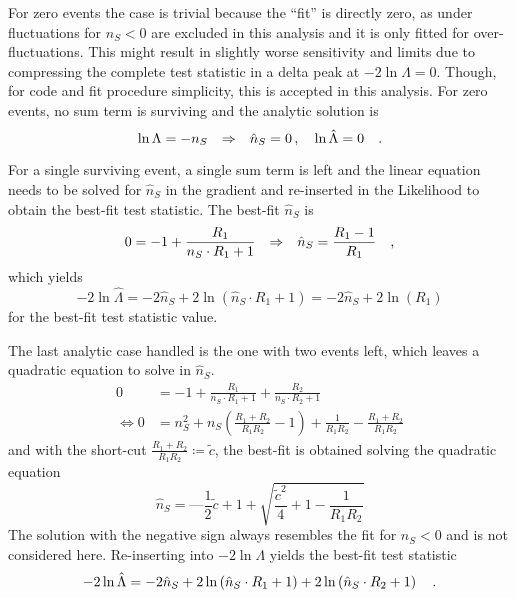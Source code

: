 For zero events the case is trivial because the \enquote{fit} is directly zero, as under fluctuations for $n_S < 0$ are excluded in this analysis and it is only fitted for over-fluctuations.
This might result in slightly worse sensitivity and limits due to compressing the complete test statistic in a delta peak at $-2\ln\Lambda=0$.
Though, for code and fit procedure simplicity, this is accepted in this analysis. \cite{Aartsen:2016lir}
For zero events, no sum term is surviving and the analytic solution is
\begin{equation}
  \ln\Lambda = -n_S
  \quad\text{$\Rightarrow$}\quad
  \hat{n}_S = 0 \, ,\quad \ln\hat{\Lambda} = 0
  \quad\text{.}
\end{equation}

For a single surviving event, a single sum term is left and the linear equation needs to be solved for $\hat{n}_S$ in the gradient and re-inserted in the Likelihood to obtain the best-fit test statistic.
The best-fit $\hat{n}_S$ is
\begin{equation}
  0 = -1 + \frac{R_1}{n_S\cdot R_1 + 1}
  \quad\text{$\Rightarrow$}\quad
  \hat{n}_S = \frac{R_1 - 1}{R_1}
  \quad\text{,}
\end{equation}
which yields
\begin{equation}
  -2\ln\hat{\Lambda}
    = -2\hat{n}_S + 2\ln\left( \hat{n}_S \cdot R_1 + 1 \right)
    = -2\hat{n}_S + 2\ln(R_1)
\end{equation}
for the best-fit test statistic value.

The last analytic case handled is the one with two events left, which leaves a quadratic equation to solve in $\hat{n}_S$.
\begin{align}
  0 &= -1 + \frac{R_1}{n_S\cdot R_1 + 1} + \frac{R_2}{n_S\cdot R_2 + 1} \\
  \Leftrightarrow
  0 &= n_S^2 + n_S \left(\frac{R_1 + R_2}{R_1 R_2} - 1\right) +
       \frac{1}{R_1 R_2} - \frac{R_1 + R_2}{R_1 R_2}
\end{align}
and with the short-cut $\frac{R_1 + R_2}{R_1 R_2} \coloneq\tilde{c}$, the best-fit is obtained solving the quadratic equation
\begin{equation}
  \hat{n}_S = —\frac{1}{2}\tilde{c} + 1 + \sqrt{\frac{\tilde{c}^2}{4} + 1 - \frac{1}{R_1 R_2}}
\end{equation}
The solution with the negative sign always resembles the fit for $n_S < 0$ and is not considered here.
Re-inserting into $-2\ln\Lambda$ yields the best-fit test statistic
\begin{equation}
  -2\ln\hat{\Lambda}
  = -2\hat{n}_S +
      2\ln\left( \hat{n}_S \cdot R_1 + 1 \right) +
      2\ln\left( \hat{n}_S \cdot R_2 + 1 \right)
  \quad\text{.}
\end{equation}


